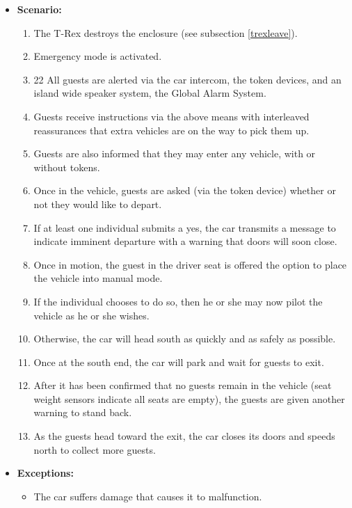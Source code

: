 \documentclass[12pt]{article}
\begin{document}
\begin{itemize}
        \item[]\textbf{Scenario:}
            \begin{enumerate}
                \item The T-Rex destroys the enclosure (see subsection \ref{trexleave}).
                \item Emergency mode is activated.
                \item22 All guests are alerted via the car intercom, the token devices, and an
                island wide speaker system, the Global Alarm System.
                \item Guests receive instructions via the above means with interleaved reassurances
                that extra vehicles are on the way to pick them up.
                \item Guests are also informed that they may enter any vehicle, with or without tokens.
                \item Once in the vehicle, guests are asked (via the token device) whether or not
                they would like to depart.
                \item If at least one individual submits a yes, the car transmits a message to indicate
                imminent departure with a warning that doors will soon close.
                \item Once in motion, the guest in the driver seat is offered the option to place the vehicle into
                manual mode.
                \item If the individual chooses to do so, then he or she may now pilot the vehicle as he or she wishes.
                \item Otherwise, the car will head south as quickly and as safely as possible.
                \item Once at the south end, the car will park and wait for guests to exit.
                \item After it has been confirmed that no guests remain in the vehicle (seat weight sensors
                indicate all seats are empty), the guests are given another warning to stand back.
                \item As the guests head toward the exit, the car closes its doors and speeds north 
                to collect more guests.
            \end{enumerate}

        \item[]\textbf{Exceptions:}
            \begin{itemize}
                \item[] The car suffers damage that causes it to malfunction.
            \end{itemize}


\end{itemize}
\end{document}
